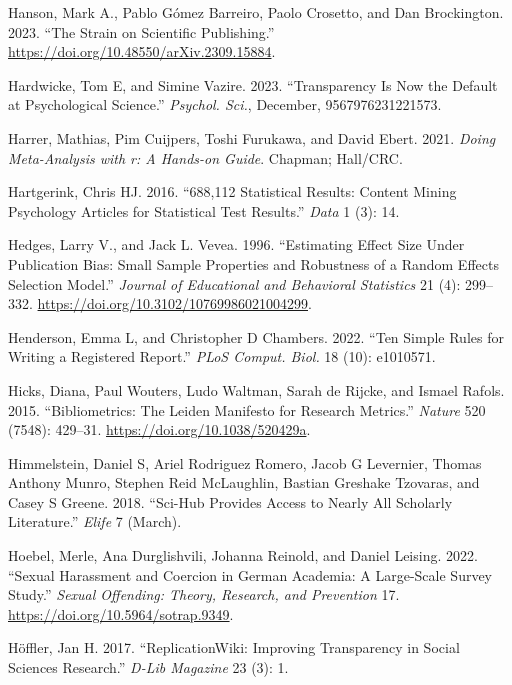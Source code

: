 \documentclass[
  letterpaper,
  DIV=11,
  numbers=noendperiod]{scrreprt}
\newlength{\cslhangindent}
\newenvironment{CSLReferences}[2] %
 {\begin{list}{}{%
  \setlength{\itemindent}{0pt}
  \setlength{\leftmargin}{0pt}
  \setlength{\parsep}{0pt}
  \ifodd #1
   \setlength{\leftmargin}{\cslhangindent}
   \setlength{\itemindent}{-1\cslhangindent}
  \fi
  \setlength{\itemsep}{#2\baselineskip}}}
 {\end{list}}
\begin{document}
\begin{CSLReferences}{1}{0}
Hanson, Mark A., Pablo Gómez Barreiro, Paolo Crosetto, and Dan
Brockington. 2023. {``The Strain on Scientific Publishing.''}
\url{https://doi.org/10.48550/arXiv.2309.15884}.

Hardwicke, Tom E, and Simine Vazire. 2023. {``Transparency Is Now the
Default at Psychological Science.''} \emph{Psychol. Sci.}, December,
9567976231221573.

Harrer, Mathias, Pim Cuijpers, Toshi Furukawa, and David Ebert. 2021.
\emph{Doing Meta-Analysis with r: A Hands-on Guide}. Chapman; Hall/CRC.

Hartgerink, Chris HJ. 2016. {``688,112 Statistical Results: Content
Mining Psychology Articles for Statistical Test Results.''} \emph{Data}
1 (3): 14.

Hedges, Larry V., and Jack L. Vevea. 1996. {``Estimating Effect Size
Under Publication Bias: Small Sample Properties and Robustness of a
Random Effects Selection Model.''} \emph{Journal of Educational and
Behavioral Statistics} 21 (4): 299--332.
\url{https://doi.org/10.3102/10769986021004299}.

Henderson, Emma L, and Christopher D Chambers. 2022. {``Ten Simple Rules
for Writing a Registered Report.''} \emph{PLoS Comput. Biol.} 18 (10):
e1010571.

Hicks, Diana, Paul Wouters, Ludo Waltman, Sarah de Rijcke, and Ismael
Rafols. 2015. {``Bibliometrics: The Leiden Manifesto for Research
Metrics.''} \emph{Nature} 520 (7548): 429--31.
\url{https://doi.org/10.1038/520429a}.

Himmelstein, Daniel S, Ariel Rodriguez Romero, Jacob G Levernier, Thomas
Anthony Munro, Stephen Reid McLaughlin, Bastian Greshake Tzovaras, and
Casey S Greene. 2018. {``{Sci-Hub} Provides Access to Nearly All
Scholarly Literature.''} \emph{Elife} 7 (March).

Hoebel, Merle, Ana Durglishvili, Johanna Reinold, and Daniel Leising.
2022. {``Sexual Harassment and Coercion in German Academia: A
Large-Scale Survey Study.''} \emph{Sexual Offending: Theory, Research,
and Prevention} 17. \url{https://doi.org/10.5964/sotrap.9349}.

Höffler, Jan H. 2017. {``ReplicationWiki: Improving Transparency in
Social Sciences Research.''} \emph{D-Lib Magazine} 23 (3): 1.


\end{CSLReferences}
\end{document}
